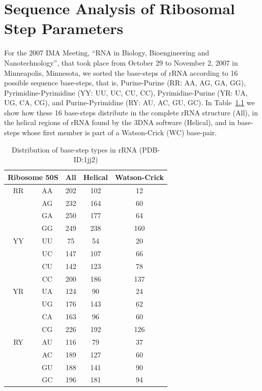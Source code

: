 \chapter{Sequence Analysis of Ribosomal Step Parameters}
%
\label{sequence} 

For the 2007 IMA Meeting, ``RNA in Biology, Bioengineering and
Nanotechnology'', that took place from October 29 to November 2, 2007 in
Minneapolis, Minnesota, we sorted the base-steps of rRNA
according to 16 possible sequence base-steps, that is, Purine-Purine
(RR: AA, AG, GA, GG), Pyrimidine-Pyrimidine (YY: UU, UC, CU, CC),
Pyrimidine-Purine (YR: UA, UG, CA, CG), and Purine-Pyrimidine (RY: AU,
AC, GU, GC).
In Table~\ref{tab:distribution} we show how these 16 base-steps
distribute in the complete rRNA structure (All), in the helical regions of
rRNA found by the 3DNA software (Helical), and in base-steps whose
first member is part of a Watson-Crick (WC) base-pair.

\begin{table}[htbp]
\begin{center}
{\small
\begin{tabular}{|c|c|c|c|c|}
\hline
\multicolumn{2}{|c|}{Ribosome  50S}& All & Helical & Watson-Crick \\ \hline
RR & AA & 202 & 102 & 12  \\ \hline
   & AG & 232 & 164 & 60  \\ \hline
   & GA & 250 & 177 & 64  \\ \hline
   & GG & 249 & 238 & 160 \\ \hline
YY & UU & 75  & 54  & 20  \\ \hline
   & UC & 147 & 107 & 66  \\ \hline
   & CU & 142 & 123 & 78  \\ \hline
   & CC & 200 & 186 & 137 \\ \hline
YR & UA & 124 & 90  & 24  \\ \hline
   & UG & 176 & 143 & 62  \\ \hline
   & CA & 163 & 96  & 60  \\ \hline
   & CG & 226 & 192 & 126 \\ \hline
RY & AU & 116 & 79  & 37  \\ \hline
   & AC & 189 & 127 & 60  \\ \hline
   & GU & 188 & 141 & 90  \\ \hline
   & GC & 196 & 181 & 94  \\ \hline
\end{tabular}
}
\caption{Distribution of base-step types in rRNA (PDB-ID:1jj2)}
\label{tab:distribution}
\end{center}
\end{table}


